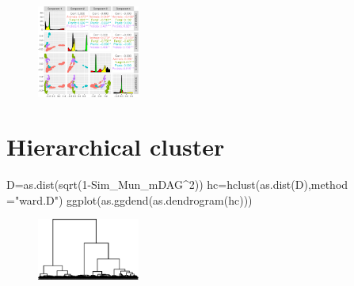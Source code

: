 \documentclass[
  letterpaper,
  DIV=11,
  numbers=noendperiod]{scrreprt}
\newenvironment{Shaded}{\begin{snugshade}}{\end{snugshade}}
\newcommand{\AttributeTok}[1]{\textcolor[rgb]{0.40,0.45,0.13}{#1}}
\newcommand{\DecValTok}[1]{\textcolor[rgb]{0.68,0.00,0.00}{#1}}
\newcommand{\FunctionTok}[1]{\textcolor[rgb]{0.28,0.35,0.67}{#1}}
\newcommand{\NormalTok}[1]{\textcolor[rgb]{0.00,0.23,0.31}{#1}}
\newcommand{\OtherTok}[1]{\textcolor[rgb]{0.00,0.23,0.31}{#1}}
\newcommand{\SpecialCharTok}[1]{\textcolor[rgb]{0.37,0.37,0.37}{#1}}
\newcommand{\StringTok}[1]{\textcolor[rgb]{0.13,0.47,0.30}{#1}}
\begin{document}
\begin{figure}[H]

{\centering \includegraphics[width=0.3\textwidth,height=\textheight]{index_files/figure-pdf/unnamed-chunk-39-1.pdf}

}

\end{figure}


\hypertarget{hierarchical-cluster-1}{%
\chapter*{Hierarchical cluster}\label{hierarchical-cluster-1}}


\begin{Shaded}
\begin{Highlighting}[]
\NormalTok{D}\OtherTok{=}\FunctionTok{as.dist}\NormalTok{(}\FunctionTok{sqrt}\NormalTok{(}\DecValTok{1}\SpecialCharTok{{-}}\NormalTok{Sim\_Mun\_mDAG}\SpecialCharTok{\^{}}\DecValTok{2}\NormalTok{))}
\NormalTok{hc}\OtherTok{=}\FunctionTok{hclust}\NormalTok{(}\FunctionTok{as.dist}\NormalTok{(D),}\AttributeTok{method =}\StringTok{"ward.D"}\NormalTok{)}
\FunctionTok{ggplot}\NormalTok{(}\FunctionTok{as.ggdend}\NormalTok{(}\FunctionTok{as.dendrogram}\NormalTok{(hc)))}
\end{Highlighting}
\end{Shaded}

\begin{figure}[H]

{\centering \includegraphics[width=0.3\textwidth,height=\textheight]{index_files/figure-pdf/unnamed-chunk-40-1.pdf}

}

\end{figure}
\end{document}
